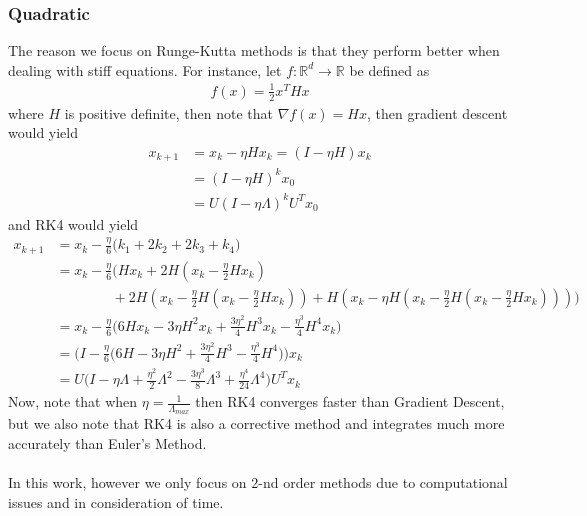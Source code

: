\subsubsection*{Quadratic}
The reason we focus on Runge-Kutta methods is that they perform better when dealing with stiff equations. For instance, let $f : \mathbb{R}^{d} \rightarrow \mathbb{R}$ be defined as
\begin{align*}
f(x) = \frac{1}{2} x^{T}H x  %
\end{align*}
where $H$ is positive definite, then note that $\nabla f(x) = Hx$, then gradient descent would yield
\begin{align*}
x_{k + 1} &= x_{k} - \eta H x_{k} = (I - \eta H) x_{k} \\
&= (I - \eta H)^{k} x_{0} \\
&= U (I - \eta \Lambda)^{k} U^{T} x_{0}
\end{align*}
and RK4 would yield
\begin{align*}
x_{k + 1} &= x_{k} - \frac{\eta}{6} \bigg( k_1 + 2 k_2 + 2 k_3 + k_4 \bigg) \\
&= x_k -  \frac{\eta}{6} \bigg( H x_k + 2 H (x_k - \frac{\eta}{2} H x_k ) \\
& \qquad \qquad + 2 H(x_k - \frac{\eta}{2} H (x_k - \frac{\eta}{2} H x_k )) + H(x_k - \eta H(x_k - \frac{\eta}{2} H (x_k - \frac{\eta}{2} H x_k )) ) \bigg) \\
&= x_k - \frac{\eta}{6} \bigg( 6 H x_k - 3 \eta H^{2} x_k + \frac{3 \eta^{2}}{4}H^{3}x_k - \frac{\eta^{3}}{4}H^{4} x_k  \bigg) \\
&= \bigg( I - \frac{\eta}{6} \big( 6 H - 3 \eta H^{2} + \frac{3 \eta^{2}}{4}H^{3} - \frac{\eta^{3}}{4}H^{4} \big) \bigg) x_k \\
&= U \bigg( I - \eta \Lambda +  \frac{\eta^{2}}{2} \Lambda^{2} - \frac{3 \eta^{3}}{8} \Lambda^{3} + \frac{\eta^{4}}{24} \Lambda^{4} \bigg) U^{T} x_k
\end{align*}
Now,  note that when $\eta=\frac{1}{\Lambda_{max}}$ then RK4 converges faster than Gradient Descent, but we also note that RK4 is also a corrective method and integrates much more accurately than Euler's Method.
\\
\\
In this work, however we only focus on $2$-nd order methods due to computational issues and in consideration of time.
